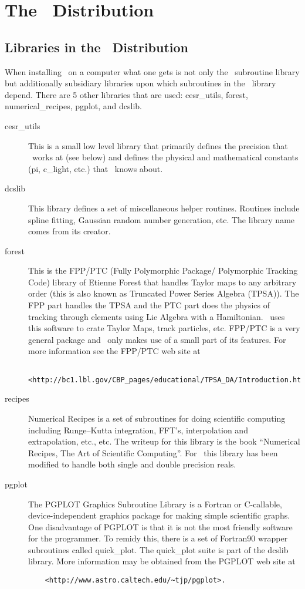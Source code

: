 \chapter{The \bmad\ Distribution}

\section{Libraries in the \bmad\ Distribution}

When installing \bmad\ on a computer what one gets is not only the \bmad\
subroutine library but additionally subsidiary libraries upon which
subroutines in the \bmad\ library depend. There are 5 other libraries
that are used: cesr\_utils, forest, numerical\_recipes, pgplot, and dcslib.
\begin{description}
\item[cesr\_utils] This is a small low level library that primarily defines 
the precision that \bmad\ works at (see below) and defines the physical
and mathematical constants (pi, c\_light, etc.) that \bmad\ knows
about.
\item[dcslib] This library defines a set of miscellaneous helper routines. 
Routines include spline fitting, Gaussian random number generation,
etc. The library name comes from its creator.
\item[forest] This is the FPP/PTC 
(Fully Polymorphic Package/ Polymorphic Tracking Code) library of
Etienne Forest that handles Taylor maps to any arbitrary order (this
is also known as Truncated Power Series Algebra (TPSA)). The FPP part
handles the TPSA and the PTC part does the physics of tracking through
elements using Lie Algebra with a Hamiltonian.  \bmad\ uses this
software to crate Taylor Maps, track particles, etc.  FPP/PTC is a
very general package and \bmad\ only makes use of a small part of its
features. For more information see the FPP/PTC web site at
\begin{verbatim} 
    <http://bc1.lbl.gov/CBP_pages/educational/TPSA_DA/Introduction.html>
\end{verbatim}
\item[recipes] Numerical Recipes is a set of subroutines for doing 
scientific computing including Runge--Kutta integration, FFT's,
interpolation and extrapolation, etc., etc. The writeup for this
library is the book ``Numerical Recipes, The Art of Scientific
Computing''\cite{?}. For \bmad\ this library has been modified to handle
both single and double precision reals.
\item[pgplot] The PGPLOT Graphics Subroutine Library is a Fortran or 
C-callable, device-independent graphics package for making simple
scientific graphs.  One
disadvantage of PGPLOT is that it is not the most friendly software
for the programmer. To remidy this, there is a set of Fortran90
wrapper subroutines called quick\_plot. The quick\_plot suite is part
of the dcslib library. More information may be obtained from the PGPLOT
web site at 
\begin{verbatim}
    <http://www.astro.caltech.edu/~tjp/pgplot>.
\end{verbatim}

\end{description}

